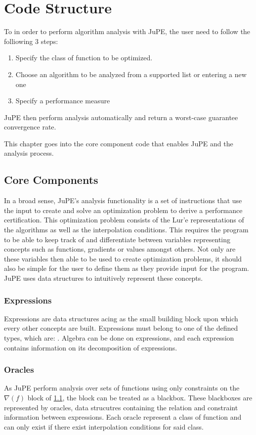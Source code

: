 \chapter{Code Structure}

To in order to perform algorithm analysis with JuPE, the user need to follow the folliowing 3 steps:
\begin{enumerate}
	\item Specify the class of function to be optimized.
	\item Choose an algorithm to be analyzed from a supported list or entering a new one 
	\item Specify a performance measure
  \end{enumerate}
JuPE then perform analysis automatically and return a worst-case guarantee convergence rate.

This chapter goes into the core component code that enables JuPE and the analysis process.

\section{Core Components}

In a broad sense, JuPE's analysis functionality is a set of instructions that use the input to create and solve an optimization problem to derive a performance certification. This optimization problem consists of the Lur'e representations of the algorithms as well as the interpolation conditions. This requires the program to be able to keep track of and differentiate between variables representing concepts such as functions, gradients or values amongst others. Not only are these variables then able to be used to create optimization problems, it should also be simple for the user to define them as they provide input for the program. JuPE uses data structures to intuitively represent these concepts.

\subsection*{Expressions}
Expressions are data structures acing as the small building block upon which every other concepts are built. Expressions must belong to one of the defined types, which are: . Algebra can be done on expressions, and each expression contains information on its decomposition of expressions. 

\subsection*{Oracles}
As JuPE perform analysis over sets of functions using only constraints on the \(\nabla (f)\) block of \ref{}, the block can be treated as a blackbox. These blackboxes are represented by oracles, data strucutres containing the relation and constraint information between expressions. Each oracle represent a class of function and can only exist if there exist interpolation conditions for said class.

